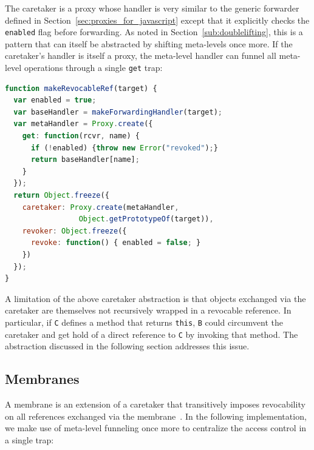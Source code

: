\documentclass{acm_proc_article-sp}
\begin{document}
The caretaker is a proxy whose handler is very similar to the generic forwarder defined in Section~\ref{sec:proxies_for_javascript} except that it explicitly checks the \texttt{enabled} flag before forwarding. As noted in Section~\ref{sub:doublelifting}, this is a pattern that can itself be abstracted by shifting meta-levels once more. If the caretaker's handler is itself a proxy, the meta-level handler can funnel all meta-level operations through a single \texttt{get} trap:

\begin{lstlisting}[language=javascript]
function makeRevocableRef(target) {
  var enabled = true;
  var baseHandler = makeForwardingHandler(target);
  var metaHandler = Proxy.create({
    get: function(rcvr, name) {
      if (!enabled) {throw new Error("revoked");}
      return baseHandler[name];
    }
  });
  return Object.freeze({
    caretaker: Proxy.create(metaHandler, 
                 Object.getPrototypeOf(target)),
    revoker: Object.freeze({
      revoke: function() { enabled = false; }
    })
  });
}
\end{lstlisting}


A limitation of the above caretaker abstraction is that objects exchanged via the caretaker are themselves not recursively wrapped in a revocable reference. In particular, if \texttt{C} defines a method that returns \texttt{this}, \texttt{B} could circumvent the caretaker and get hold of a direct reference to \texttt{C} by invoking that method. The abstraction discussed in the following section addresses this issue.

\subsection{Membranes}
\label{sub:membranes}

A membrane is an extension of a caretaker that transitively imposes revocability on all references exchanged via the membrane~\cite{miller06robust}. In the following implementation, we make use of meta-level funneling once more to centralize the access control in a single trap:
\end{document}
